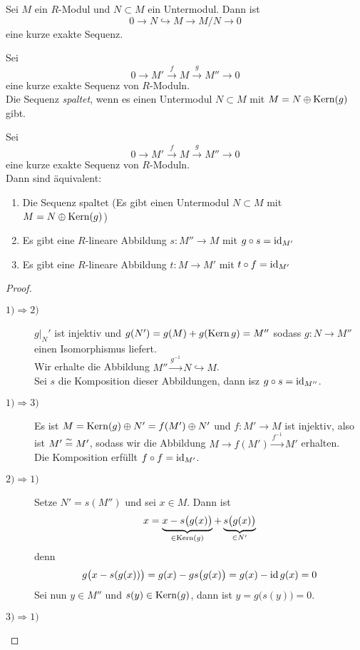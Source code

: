 	\begin{exm}
		Sei $M$ ein $R$-Modul und $N\subset M$ ein Untermodul. Dann ist
		\[0\to N\hookrightarrow M\to M/N\to 0\]
		eine kurze exakte Sequenz.
	\end{exm}
	
	\begin{definition}
			Sei
		\[0\to M'\xrightarrow{f}M\xrightarrow{g}M''\to 0\]
		eine kurze exakte Sequenz von $R$-Moduln.\\
		Die Sequenz \emph{spaltet}, wenn es einen Untermodul $N\subset M$ mit $M=N\oplus\operatorname{Kern}(g)$ gibt.
	\end{definition}
	
	\begin{satz}
		Sei
		\[0\to M'\xrightarrow{f}M\xrightarrow{g}M''\to 0\]
		eine kurze exakte Sequenz von $R$-Moduln.\\
		Dann sind äquivalent:
		\begin{enumerate}
			\item Die Sequenz spaltet (Es gibt einen Untermodul $N\subset M$ mit $M=N\oplus\operatorname{Kern}(g)$)
			\item Es gibt eine $R$-lineare Abbildung $s:M''\to M$ mit $g\circ s=\operatorname{id}_{M'}$
			\item Es gibt eine $R$-lineare Abbildung $t:M\to M'$ mit $t\circ f=\operatorname{id}_{M'}$
		\end{enumerate}
	\end{satz}
	\begin{proof}
		\begin{description}
			\item[$1)\Rightarrow2)$] $g|_N'$ ist injektiv und
			$g(N')=g(M)+g(\operatorname{Kern} g)=M''$ %
			sodass $g:N\to M''$ einen Isomorphismus liefert.\\
			Wir erhalte die Abbildung $M''\xrightarrow{g^{-1}}N\hookrightarrow M$.\\
			Sei $s$ die Komposition dieser Abbildungen, dann isz $g\circ s=\operatorname{id}_{M''}$.
			\item[$1)\Rightarrow3)$] Es ist $M=\operatorname{Kern}(g)\oplus N'=f(M')\oplus N'$ und $f:M'\to M$ ist injektiv, also ist $M'\overset{\sim}{=} M'$, sodass wir die Abbildung $M\to f(M')\xrightarrow{f^{-1}} M'$ erhalten.\\
			Die Komposition erfüllt $f\circ f=\operatorname{id}_{M'}$.
			\item[$2)\Rightarrow1)$] Setze $N'=s(M'')$ und sei $x\in M$. Dann ist
			\[x=\underbrace{x-s\big(g(x)\big)}_{\in\operatorname{Kern}(g)}+\underbrace{s\big(g(x)\big)}_{\in N'}\]
			denn
			\[g\big(x-s(g(x))\big)=g(x)-gs\big(g(x)\big)=g(x)-\operatorname{id} g(x)=0\]
			Sei nun $y\in M''$ und $s(y)\in \operatorname{Kern}(g)$, dann ist $y=g\big(s(y)\big)=0$.
			\item[$3)\Rightarrow1)$]
		\end{description}
	\end{proof}

